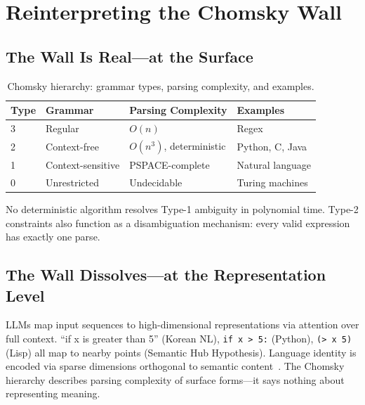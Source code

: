 \documentclass{article}
\theoremstyle{definition}
\begin{document}
\section{Reinterpreting the Chomsky Wall}\label{sec:chomsky}

\subsection{The Wall Is Real---at the Surface}

\begin{table}[t]
\centering
\caption{Chomsky hierarchy: grammar types, parsing complexity, and examples.}
\label{tab:chomsky}
\small
\begin{tabular}{llll}
\toprule
\textbf{Type} & \textbf{Grammar} & \textbf{Parsing Complexity} & \textbf{Examples} \\
\midrule
3 & Regular & $O(n)$ & Regex \\
2 & Context-free & $O(n^3)$, deterministic & Python, C, Java \\
1 & Context-sensitive & PSPACE-complete & Natural language \\
0 & Unrestricted & Undecidable & Turing machines \\
\bottomrule
\end{tabular}
\end{table}

No deterministic algorithm resolves Type-1 ambiguity in polynomial time. Type-2 constraints also function as a disambiguation mechanism: every valid expression has exactly one parse.

\subsection{The Wall Dissolves---at the Representation Level}

LLMs map input sequences to high-dimensional representations via attention over full context. ``if x is greater than 5'' (Korean NL), \texttt{if x > 5:} (Python), \texttt{(> x 5)} (Lisp) all map to nearby points (Semantic Hub Hypothesis). Language identity is encoded via sparse dimensions orthogonal to semantic content~\citep{zhong2025sparse}. The Chomsky hierarchy describes parsing complexity of surface forms---it says nothing about representing meaning.
\end{document}

